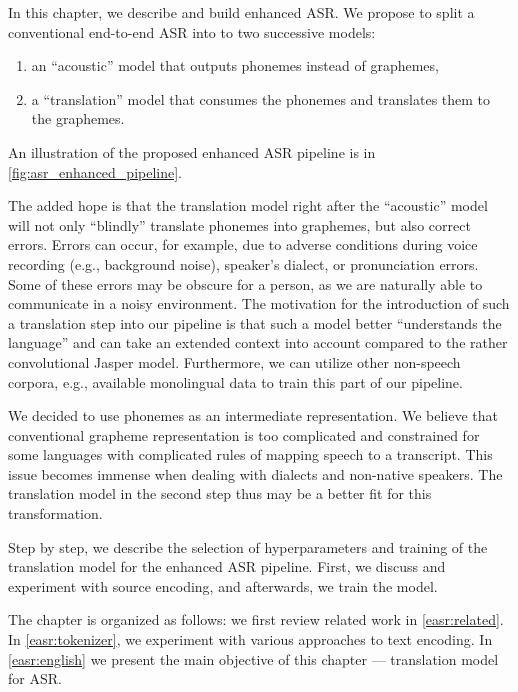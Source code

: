 In this chapter, we describe and build enhanced ASR. We propose to split a conventional end-to-end ASR into to two successive models: 

\begin{enumerate}
	\item an ``acoustic'' model that outputs phonemes instead of graphemes,
	\item a ``translation'' model that consumes the phonemes and translates them to the graphemes.
\end{enumerate}

An illustration of the proposed enhanced ASR pipeline is in \cref{fig:asr_enhanced_pipeline}.

The added hope is that the translation model right after the ``acoustic'' model will not only ``blindly'' translate phonemes into graphemes, but also correct errors. Errors can occur, for example, due to adverse conditions during voice recording (e.g., background noise), speaker's dialect, or pronunciation errors. Some of these errors may be obscure for a person, as we are naturally able to communicate in a noisy environment. The motivation for the introduction of such a translation step into our pipeline is that such a model better ``understands the language'' and can take an extended context into account compared to the rather convolutional Jasper model. Furthermore, we can utilize other non-speech corpora, e.g., available monolingual data to train this part of our pipeline.

We decided to use phonemes as an intermediate representation. We believe that conventional grapheme representation is too complicated and constrained for some languages with complicated rules of mapping speech to a transcript. This issue becomes immense when dealing with dialects and non-native speakers. The translation model in the second step thus may be a better fit for this transformation.

Step by step, we describe the selection of hyperparameters and training of the translation model for the enhanced ASR pipeline. First, we discuss and experiment with source encoding, and afterwards, we train the model.

The chapter is organized as follows: we first review related work in \cref{easr:related}. In \cref{easr:tokenizer}, we experiment with various approaches to text encoding. In \cref{easr:english} we present the main objective of this chapter --- translation model for ASR.





